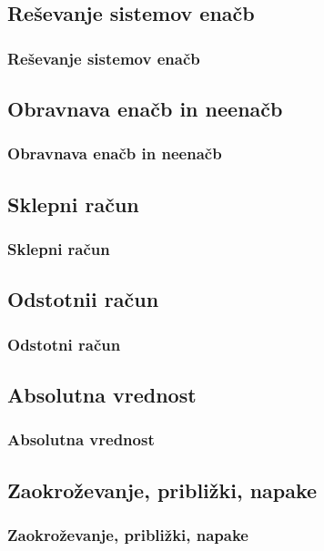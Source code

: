     
    
    \subsection{Reševanje sistemov enačb}

        \begin{frame}
            \frametitle{Reševanje sistemov enačb}
        \end{frame}


    \subsection{Obravnava enačb in neenačb}

        \begin{frame}
            \frametitle{Obravnava enačb in neenačb}
        \end{frame}

     
    \subsection{Sklepni račun}

        \begin{frame}
            \frametitle{Sklepni račun}
        \end{frame}


    \subsection{Odstotnii račun}

        \begin{frame}
            \frametitle{Odstotni račun}
        \end{frame}


    \subsection{Absolutna vrednost}

        \begin{frame}
            \frametitle{Absolutna vrednost}
        \end{frame}

    \subsection{Zaokroževanje, približki, napake}

        \begin{frame}
            \frametitle{Zaokroževanje, približki, napake}
        \end{frame}

   